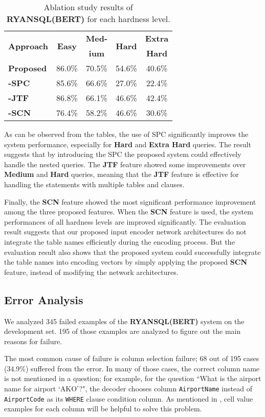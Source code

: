 \documentclass[11pt,a4paper]{article}
\begin{document}
\begin{table}
\centering
\begin{tabular}{|l|c|c|c|c|} \hline
\multirow{2}{*}{\textbf{Approach}} & \multirow{2}{*}{\textbf{Easy}} & \textbf{Med-} & \multirow{2}{*}{\textbf{Hard}} & \textbf{Extra} \\
&&\textbf{ium}&&\textbf{Hard} \\ \hline
\textbf{Proposed}&86.0\%&70.5\%&54.6\%&40.6\% \\ 
\textbf{-SPC}&85.6\%&66.6\%&27.0\%&22.4\% \\ 
\textbf{-JTF}&86.8\%&66.1\%&46.6\%&42.4\% \\ 
\textbf{-SCN}&76.4\%&58.2\%&46.6\%&30.6\% \\ \hline
\end{tabular}
\caption{Ablation study results of \textbf{RYANSQL(BERT)} for each hardness level.}
\label{tbl:diff}
\end{table}


As can be observed from the tables, the use of SPC significantly improves the system performance, especially for \textbf{Hard} and \textbf{Extra Hard} queries. The result suggests that by introducing the SPC the proposed system could effectively handle the nested queries. The \textbf{JTF} feature showed some improvements over \textbf{Medium} and \textbf{Hard} queries, meaning that the \textbf{JTF} feature is effective for handling the statements with multiple tables and clauses.

Finally, the \textbf{SCN} feature showed the most significant performance improvement among the three proposed features. When the \textbf{SCN} feature is used, the system performances of all hardness levels are improved significantly. The evaluation result suggests that our proposed input encoder network architectures do not integrate the table names efficiently during the encoding process. But the evaluation result also shows that the proposed system could successfully integrate the table names into encoding vectors by simply applying the proposed \textbf{SCN} feature, instead of modifying the network architectures.

\subsection{Error Analysis}
We analyzed 345 failed examples of the \textbf{RYANSQL(BERT)} system on the development set. 195 of those examples are analyzed to figure out the main reasons for failure.

The most common cause of failure is column selection failure; 68 out of 195 cases (34.9\%) suffered from the error. In many of those cases, the correct column name is not mentioned in a question; for example, for the question ``What is the airport name for airport `AKO'?", the decoder chooses column \texttt{AirportName} instead of \texttt{AirportCode} as its \texttt{WHERE} clause condition column. As mentioned in \citet{cellvalue}, cell value examples for each column will be helpful to solve this problem.
\end{document}
